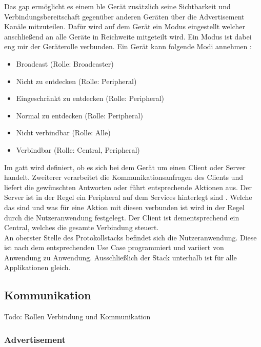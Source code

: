 \noindent Das \ac{gap} ermöglicht es einem \ac{ble} Gerät zusätzlich seine Sichtbarkeit und Verbindungsbereitschaft gegenüber anderen Geräten über die Advertisement Kanäle mitzuteilen. Dafür wird auf dem Gerät ein Modus eingestellt welcher anschließend an alle Geräte in Reichweite mitgeteilt wird. Ein Modus ist dabei eng mir der Geräterolle verbunden. Ein Gerät kann folgende Modi annehmen \cite[Seite 35]{Townsend14:GSB}:
\begin{itemize}
	\item{Broadcast (Rolle: Broadcaster)}
	\item{Nicht zu entdecken (Rolle: Peripheral)}
	\item{Eingeschränkt zu entdecken (Rolle: Peripheral)}
	\item{Normal zu entdecken (Rolle: Peripheral)}
	\item{Nicht verbindbar (Rolle: Alle)}
	\item{Verbindbar (Rolle: Central, Peripheral)}
\end{itemize}   

\noindent Im \ac{gatt} wird definiert, ob es sich bei dem Gerät um einen Client oder Server handelt. Zweiterer verarbeitet die Kommunikationsanfragen des Clients und liefert die gewünschten Antworten oder führt entsprechende Aktionen aus. Der Server ist in der Regel ein Peripheral auf dem Services hinterlegt sind \cite[Seite 30]{Usama17:BBS}. Welche das sind und was für eine Aktion mit diesen verbunden ist wird in der Regel durch die Nutzeranwendung festgelegt. Der Client ist dementsprechend ein Central, welches die gesamte Verbindung steuert.\\    

\noindent An oberster Stelle des Protokollstacks befindet sich die Nutzeranwendung. Diese ist nach dem entsprechenden Use Case programmiert und variiert von Anwendung zu Anwendung. Ausschließlich der Stack unterhalb ist für alle Applikationen gleich.\\

\subsection{Kommunikation}
\label{ss:funktionsweise:kommunkation}

Todo: Rollen Verbindung und Kommunikation

\subsubsection{Advertisement}
\label{sss:funktionsweise:advertisement}

